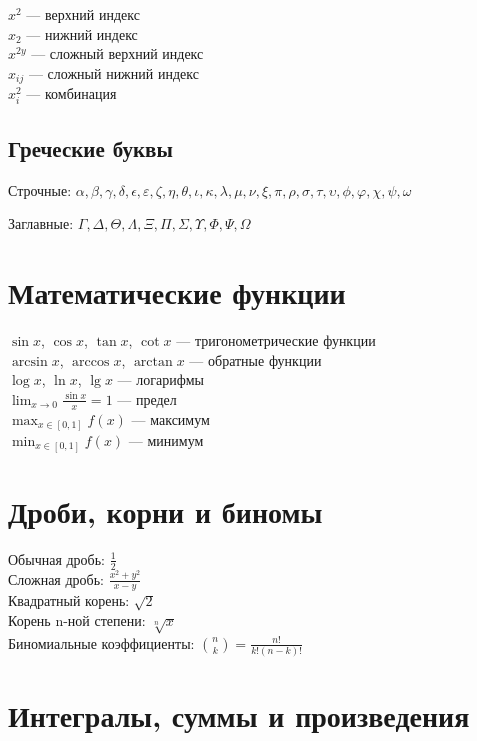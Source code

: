 \documentclass[a4paper,12pt]{article}
\begin{document}
$x^2$ — верхний индекс \\
$x_2$ — нижний индекс \\
$x^{2y}$ — сложный верхний индекс \\
$x_{ij}$ — сложный нижний индекс \\
$x^{2}_{i}$ — комбинация

\subsection{Греческие буквы}

Строчные: $\alpha, \beta, \gamma, \delta, \epsilon, \varepsilon, \zeta, \eta, \theta, \iota, \kappa, \lambda, \mu, \nu, \xi, \pi, \rho, \sigma, \tau, \upsilon, \phi, \varphi, \chi, \psi, \omega$

Заглавные: $\Gamma, \Delta, \Theta, \Lambda, \Xi, \Pi, \Sigma, \Upsilon, \Phi, \Psi, \Omega$

\section{Математические функции}

$\sin x$, $\cos x$, $\tan x$, $\cot x$ — тригонометрические функции \\
$\arcsin x$, $\arccos x$, $\arctan x$ — обратные функции \\
$\log x$, $\ln x$, $\lg x$ — логарифмы \\
$\lim_{x \to 0} \frac{\sin x}{x} = 1$ — предел \\
$\max_{x \in [0,1]} f(x)$ — максимум \\
$\min_{x \in [0,1]} f(x)$ — минимум

\section{Дроби, корни и биномы}

Обычная дробь: $\frac{1}{2}$ \\
Сложная дробь: $\frac{x^2 + y^2}{x - y}$ \\
Квадратный корень: $\sqrt{2}$ \\
Корень n-ной степени: $\sqrt[n]{x}$ \\
Биномиальные коэффициенты: $\binom{n}{k} = \frac{n!}{k!(n-k)!}$

\section{Интегралы, суммы и произведения}
\end{document}
